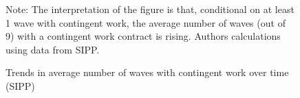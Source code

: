 \documentclass[12pt]{article}
\begin{document}
\begin{figure}[htp!]
    \caption{Trends in average number of waves with contingent work over time (SIPP)}
    \label{graph_sipp_number_avg}
    \footnotesize{Note: The interpretation of the figure is that, conditional on at least 1 wave with contingent work, the average number of waves (out of 9) with a contingent work contract is rising.  Authors calculations using data from SIPP.}
\end{figure}


\clearpage
\singlespacing


\end{document}
